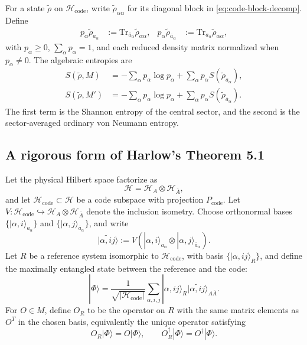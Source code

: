 \documentclass[11pt]{article}
\newcommand{\mH}{\mathcal{H}}
\newcommand{\Tr}{\mathrm{Tr}}
\newcommand{\barA}{\overline{A}}
\newcommand{\bara}{\overline{a}}
\newcommand{\ket}[1]{|#1\rangle}
\newcommand{\code}{\mathrm{code}}
\newcommand{\wt}[1]{\widetilde{#1}}
\begin{document}
For a state \(\wt{\rho}\) on \(\mH_{\code}\), write
\(\wt{\rho}_{\alpha\alpha}\) for its diagonal block in
\eqref{eq:code-block-decomp}.  Define
\begin{align}
    p_\alpha \wt{\rho}_{a_\alpha}
    &:=
    \Tr_{\bara_\alpha}\wt{\rho}_{\alpha\alpha},
    &
    p_\alpha \wt{\rho}_{\bara_\alpha}
    &:=
    \Tr_{a_\alpha}\wt{\rho}_{\alpha\alpha},
    \label{eq:block-reduced-states}
\end{align}
with \(p_\alpha\ge 0\), \(\sum_\alpha p_\alpha=1\), and each reduced density
matrix normalized when \(p_\alpha\ne0\).  The algebraic entropies are
\begin{align}
    S(\wt{\rho},M)
    &=
    -\sum_\alpha p_\alpha\log p_\alpha
    +
    \sum_\alpha p_\alpha S(\wt{\rho}_{a_\alpha}),
    \label{eq:alg-entropy-M}\\
    S(\wt{\rho},M')
    &=
    -\sum_\alpha p_\alpha\log p_\alpha
    +
    \sum_\alpha p_\alpha S(\wt{\rho}_{\bara_\alpha}).
    \label{eq:alg-entropy-Mprime}
\end{align}
The first term is the Shannon entropy of the central sector, and the second is
the sector-averaged ordinary von Neumann entropy.

\subsection*{A rigorous form of Harlow's Theorem 5.1}

Let the physical Hilbert space factorize as
\[
    \mH=\mH_A\otimes\mH_{\barA},
\]
and let \(\mH_{\code}\subset \mH\) be a code subspace with projection
\(P_{\code}\).  Let \(V:\mH_{\code}\hookrightarrow \mH_A\otimes\mH_{\barA}\)
denote the inclusion isometry.  Choose orthonormal bases
\(\{\ket{\alpha,i}_{a_\alpha}\}\) and
\(\{\ket{\alpha,j}_{\bara_\alpha}\}\), and write
\[
    \ket{\wt{\alpha,ij}}
    :=
    V\left(
    \ket{\alpha,i}_{a_\alpha}\otimes
    \ket{\alpha,j}_{\bara_\alpha}
    \right).
\]
Let \(R\) be a reference system isomorphic to \(\mH_{\code}\), with basis
\(\{\ket{\alpha,ij}_R\}\), and define the maximally entangled state between
the reference and the code:
\begin{equation}
    \ket{\Phi}
    =
    \frac{1}{\sqrt{|\mH_{\code}|}}
    \sum_{\alpha,i,j}
    \ket{\alpha,ij}_R
    \ket{\wt{\alpha,ij}}_{A\barA}.
    \label{eq:reference-state}
\end{equation}
For \(O\in M\), define \(O_R\) to be the operator on \(R\) with the same matrix
elements as \(O^T\) in the chosen basis, equivalently the unique operator
satisfying
\[
    O_R\ket{\Phi}=O\ket{\Phi},
    \qquad
    O_R^\dagger\ket{\Phi}=O^\dagger\ket{\Phi}.
\]
\end{document}
